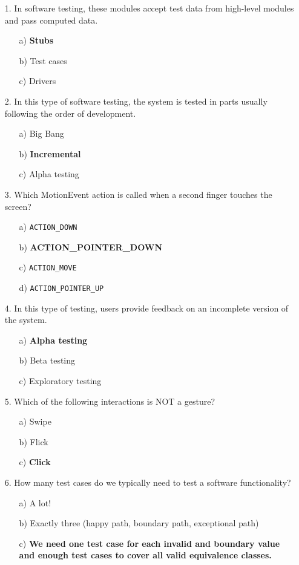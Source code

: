 \documentclass[12pt]{article}
\begin{document}
\begin{itemize}
    \item[1.] In software testing, these modules accept test data from high-level modules and pass computed data.
    \begin{itemize}
        \item[a)] \textbf{Stubs}
        \item[b)] Test cases
        \item[c)] Drivers
    \end{itemize}

    \item[2.] In this type of software testing, the system is tested in parts usually following the order of development.
    \begin{itemize}
        \item[a)] Big Bang
        \item[b)] \textbf{Incremental}
        \item[c)] Alpha testing
    \end{itemize}

    \item[3.] Which MotionEvent action is called when a second finger touches the screen?
    \begin{itemize}
        \item[a)] \texttt{ACTION\_DOWN}
        \item[b)] \textbf{ACTION\_POINTER\_DOWN}
        \item[c)] \texttt{ACTION\_MOVE}
        \item[d)] \texttt{ACTION\_POINTER\_UP}
    \end{itemize}

    \item[4.] In this type of testing, users provide feedback on an incomplete version of the system.
    \begin{itemize}
        \item[a)] \textbf{Alpha testing}
        \item[b)] Beta testing
        \item[c)] Exploratory testing
    \end{itemize}

    \item[5.] Which of the following interactions is NOT a gesture?
    \begin{itemize}
        \item[a)] Swipe
        \item[b)] Flick
        \item[c)] \textbf{Click}
    \end{itemize}
\newpage
    \item[6.] How many test cases do we typically need to test a software functionality?
    \begin{itemize}
        \item[a)] A lot!
        \item[b)] Exactly three (happy path, boundary path, exceptional path)
        \item[c)] \textbf{We need one test case for each invalid and boundary value and enough test cases to cover all valid equivalence classes.}
    \end{itemize}


\end{itemize}
\end{document}
